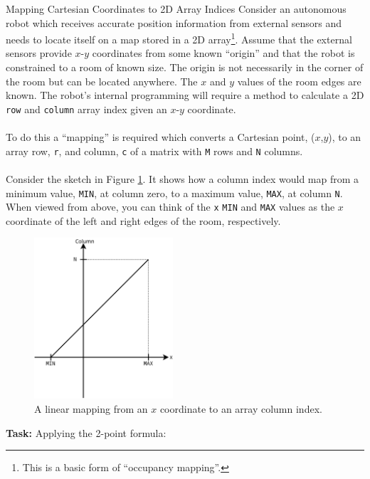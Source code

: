 \documentclass{lab}
\begin{document}
\pagebreak
\begin{task}{Mapping Cartesian Coordinates to 2D Array Indices}{}
Consider an autonomous robot which receives accurate position information from external sensors and needs to locate itself on a map stored in a 2D array\footnote{This is a basic form of ``occupancy mapping''.}. Assume that the external sensors provide $x$-$y$ coordinates from some known ``origin'' and that the robot is constrained to a room of known size. The origin is not necessarily in the corner of the room but can be located anywhere. The $x$ and $y$ values of the room edges are known. The robot's internal programming will require a method to calculate a 2D \texttt{row} and \texttt{column} array index given an $x$-$y$ coordinate.
\\~\\
To do this a ``mapping'' is required which converts a Cartesian point, ($x$,$y$), to an array row, \texttt{r}, and column, \texttt{c} of a matrix with \texttt{M} rows and \texttt{N} columns.
\\~\\
Consider the sketch in Figure \ref{fig:mapping}. It shows how a column index would map from a minimum value, \texttt{MIN}, at column zero, to a maximum value, \texttt{MAX}, at column \texttt{N}. When viewed from above, you can think of the \texttt{x} \texttt{MIN} and \texttt{MAX} values as the $x$ coordinate of the left and right edges of the room, respectively.
\begin{figure}[H]
\begin{center}
\includegraphics[width=0.46\textwidth]{mapping.png}
\end{center}
\caption{A linear mapping from an $x$ coordinate to an array column index.}\label{fig:mapping}
\end{figure}
\textbf{Task:} Applying the 2-point formula:
\begin{equation}

\end{equation}
\end{task}
\end{document}
